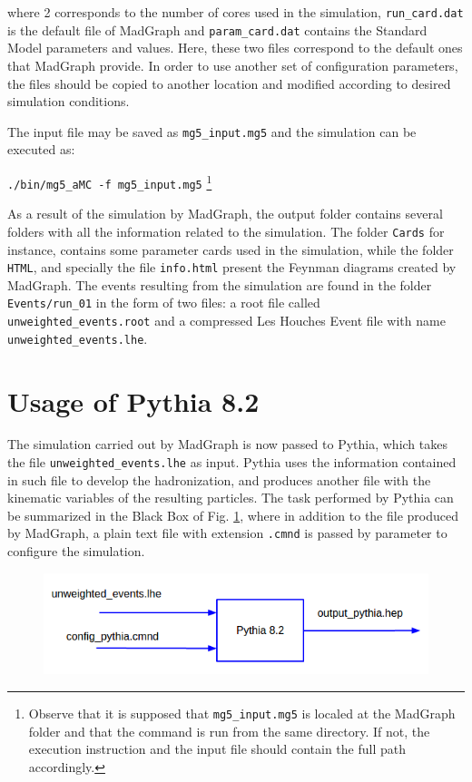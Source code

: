 \documentclass[12pt, oneside]{book}              %
\begin{document}
\noindent where 2 corresponds to the number of cores used in the simulation, 
\texttt{run\_card.dat} is the default file of MadGraph and \texttt{param\_card.dat} 
contains the Standard Model parameters and values. Here, these two files correspond
to the default ones that MadGraph provide. In order to use another set of 
configuration parameters, the files should be copied to another location
and modified according to desired simulation conditions.

The input file may be saved as \texttt{mg5\_input.mg5} and the simulation can be
executed as:

\noindent \texttt{./bin/mg5\_aMC -f mg5\_input.mg5} \footnote{Observe that it is
supposed that \texttt{mg5\_input.mg5} is localed at the MadGraph folder and that
the command is run from the same directory. If not, the execution instruction and
the input file should contain the full path accordingly.}

As a result of the simulation by MadGraph, the output folder contains several 
folders with all the information related to the simulation. The folder 
\texttt{Cards} for instance, contains some parameter cards used in the simulation,
while the folder \texttt{HTML}, and specially the file \texttt{info.html} present
the Feynman diagrams created by MadGraph. The events resulting from the simulation
are found in the folder \texttt{Events/run\_01} in the form of two files: a root 
file called \texttt{unweighted\_events.root} and a compressed Les Houches Event file
with name \texttt{unweighted\_events.lhe}.

\section{Usage of Pythia 8.2} \label{sec:Pythia8}

The simulation carried out by MadGraph is now passed to Pythia, which takes the
file \texttt{unweighted\_events.lhe} as input. Pythia uses the information 
contained in such file to develop the hadronization, and produces another file
with the kinematic variables of the resulting particles. The task performed by
Pythia can be summarized in the Black Box of Fig. \ref{fig:Black_box_pythia}, 
where in addition to the file produced by MadGraph, a plain text file with 
extension \texttt{.cmnd} is passed by parameter to configure the simulation.

\begin{figure}[h]
\centering
\includegraphics[width=0.7\linewidth]{Imags_Doc/Black_box_pythia}
\caption{}
\label{fig:Black_box_pythia}
\end{figure}
\end{document}

